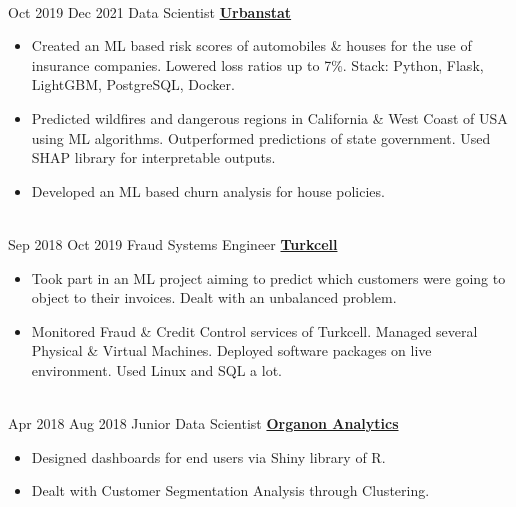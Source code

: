 \documentclass[letterpaper]{DS_class_file} %
\begin{document}
\begin{twenty}
{\begin{itemize}
                
		\end{itemize}}
		\\
	\twentyitem
		{Oct 2019}
		{Dec 2021}
		{\hspace{0.3cm}Data Scientist}
		{\href{https://www.urbanstat.com/}{\textbf{Urbanstat}}}
		{}
		{\begin{itemize}
			\item Created an ML based risk scores of automobiles \& houses for the use of insurance companies. Lowered loss ratios up to 7\%. \newline Stack: Python, Flask, LightGBM, PostgreSQL, Docker.
			\item Predicted wildfires and dangerous regions in California \& West Coast of USA using ML algorithms. Outperformed predictions of state government. Used SHAP library for interpretable outputs.
			\item Developed an ML based churn analysis for house policies.
		\end{itemize}}
		\\
	\twentyitem
		{Sep 2018}
		{Oct 2019}
		{\hspace{0.3cm}Fraud Systems Engineer}
		{\href{https://www.turkcell.com.tr/}{\textbf{Turkcell}}}
		{}
		{\begin{itemize}
			\item Took part in an ML project aiming to predict which customers were going to object to their invoices. Dealt with an unbalanced problem.
			\item Monitored Fraud \& Credit Control services of Turkcell. Managed several Physical \& Virtual Machines. Deployed software packages on live environment. Used Linux and SQL a lot.
		\end{itemize}}
		\\
	\twentyitem
		{Apr 2018}
		{Aug 2018}
		{\hspace{0.3cm}Junior Data Scientist}
		{\href{http://www.organonanalytics.com/pages/index.php}{\textbf{Organon Analytics}}}
		{}
		{\begin{itemize}
			\item Designed dashboards for end users via Shiny library of R.
			\item Dealt with Customer Segmentation Analysis through Clustering.
		\end{itemize}}
		\\
\end{twenty}
\end{document}
